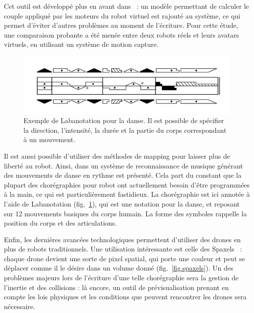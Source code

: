 \documentclass[french,12pt]{article}
\begin{document}
Cet outil est développé plus en avant dans~\cite{lee_virtual_2014} : un modèle permettant de calculer le couple appliqué par les moteurs du robot virtuel est rajouté au système, ce qui permet d'éviter d'autres problèmes au moment de l'écriture.
Pour cette étude, une comparaison probante a été menée entre deux robots réels et leurs avatars virtuels, en utilisant un système de motion capture.

\begin{figure}[h]
    \centering
    \includegraphics[scale=0.35]{images/Labanotation.png}
    \caption{Exemple de Labanotation pour la danse. Il est possible de spécifier la direction, l'intensité, la durée et la partie du corps correspondant à un mouvement.}
    \label{fig.labanotation}
\end{figure}

Il est aussi possible d'utiliser des méthodes de mapping pour laisser plus de liberté au robot. Ainsi, dans \cite{seo_autonomous_2013} un système de reconnaissance de musique générant des mouvements de danse en rythme est présenté. Cela part du constant que la plupart des chorégraphies pour robot ont actuellement besoin d'être programmées à la main, ce qui est particulièrement fastidieux. La chorégraphie est ici annotée à l'aide de Labanotation (fig.~\ref{fig.labanotation}), qui est une notation pour la danse, et reposant sur 12 mouvements basiques du corps humain. La forme des symboles rappelle la position du corps et des articulations.

Enfin, les dernières avancées technologiques permettent d'utiliser des drones en plus de robots traditionnels. Une utilisation intéressante est celle des Spaxels~\cite{hortner_spaxels_2012} : chaque drone devient une sorte de pixel spatial, qui porte une couleur et peut se déplacer comme il le désire dans un volume donné (fig.~\ref{fig.spaxels}).   
Un des problèmes majeurs lors de l'écriture d'une telle chorégraphie sera la gestion de l'inertie et des collisions : là encore, un outil de prévisualisation prenant en compte les lois physiques et les conditions que peuvent rencontrer les drones sera nécessaire.
\end{document}

